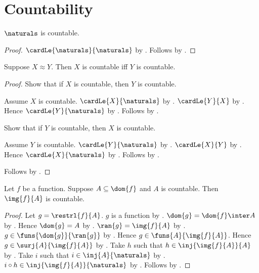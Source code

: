 \section{Countability}








\begin{proposition}\label{naturals_is_countable}
    $\naturals$ is countable.
\end{proposition}
\begin{proof}
    $\cardLe{\naturals}{\naturals}$ by .
    Follows by .
\end{proof}

\begin{theorem}\label{countable_equinumerous}
    Suppose $X\approx Y$.
    Then $X$ is countable iff $Y$ is countable.
\end{theorem}
\begin{proof}
    Show that if $X$ is countable, then $Y$ is countable.
    \begin{subproof}
        Assume $X$ is countable.
        $\cardLe{X}{\naturals}$
            by .
        $\cardLe{Y}{X}$ by .
        Hence $\cardLe{Y}{\naturals}$ by .
        Follows by .
    \end{subproof}
    Show that if $Y$ is countable, then $X$ is countable.
    \begin{subproof}
        Assume $Y$ is countable.
        $\cardLe{Y}{\naturals}$
            by .
        $\cardLe{X}{Y}$ by .
        Hence $\cardLe{X}{\naturals}$ by .
        Follows by .
    \end{subproof}
    Follows by \auto.
\end{proof}

\begin{theorem}\label{countable_function_image}
    Let $f$ be a function.
    Suppose $A\subseteq\dom{f}$ and $A$ is countable.
    Then $\img{f}{A}$ is countable.
\end{theorem}
\begin{proof}
    Let $g=\restrl{f}{A}$.
    $g$ is a function by .
    $\dom{g}=\dom{f}\inter A$ by .
    Hence $\dom{g}=A$ by .
    $\ran{g}=\img{f}{A}$ by .
    $g\in\funs{\dom{g}}{\ran{g}}$
        by .
    Hence $g\in\funs{A}{\img{f}{A}}$.
    Hence $g\in\surj{A}{\img{f}{A}}$ by .
    Take $h$ such that $h\in\inj{\img{f}{A}}{A}$
        by .
    Take $i$ such that $i\in\inj{A}{\naturals}$
        by .
    $i\circ h\in\inj{\img{f}{A}}{\naturals}$ by .
    Follows by .
\end{proof}

